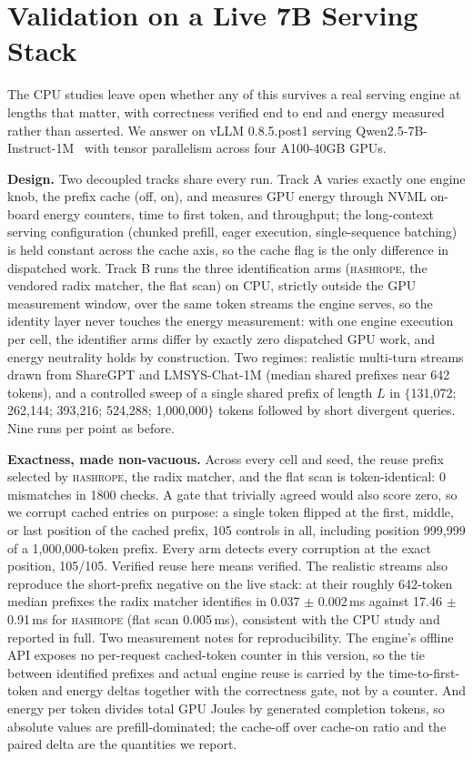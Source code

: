 \documentclass[10pt,conference]{IEEEtran}
\newcommand{\hr}{\textsc{hashrope}}
\newcommand{\ms}{\,ms}
\begin{document}
\section{Validation on a Live 7B Serving Stack}\label{sec:realstack}

The CPU studies leave open whether any of this survives a real serving
engine at lengths that matter, with correctness verified end to end and
energy measured rather than asserted. We answer on vLLM 0.8.5.post1
serving Qwen2.5-7B-Instruct-1M~\cite{yang2025qwen1m} with tensor
parallelism across four A100-40GB GPUs.

\textbf{Design.} Two decoupled tracks share every run. Track A varies
exactly one engine knob, the prefix cache (off, on), and measures GPU
energy through NVML on-board energy counters, time to first token, and
throughput; the long-context serving configuration (chunked prefill,
eager execution, single-sequence batching) is held constant across the
cache axis, so the cache flag is the only difference in dispatched
work. Track B runs the three identification arms (\hr{}, the
vendored radix matcher, the flat scan) on CPU, strictly outside the GPU
measurement window, over the same token streams the engine serves, so
the identity layer never touches the energy measurement: with one
engine execution per cell, the identifier arms differ by exactly zero
dispatched GPU work, and energy neutrality holds by construction. Two
regimes: realistic multi-turn
streams drawn from ShareGPT and LMSYS-Chat-1M (median shared prefixes
near 642 tokens), and a controlled sweep of a single shared prefix of
length $L$ in $\{$131{,}072; 262{,}144; 393{,}216; 524{,}288;
1{,}000{,}000$\}$ tokens followed by short divergent queries. Nine runs
per point as before.

\textbf{Exactness, made non-vacuous.} Across every cell and seed, the
reuse prefix selected by \hr{}, the radix matcher, and the flat scan is
token-identical: 0 mismatches in 1800 checks. A gate that trivially
agreed would also score zero, so we corrupt cached entries on purpose:
a single token flipped at the first, middle, or last position of the
cached prefix, 105 controls in all, including position 999{,}999 of a
1{,}000{,}000-token prefix. Every arm detects every corruption at the
exact position, 105/105. Verified reuse here means verified. The
realistic streams also reproduce the short-prefix negative on the live
stack: at their roughly 642-token median prefixes the radix matcher
identifies in 0.037 $\pm$ 0.002\ms{} against 17.46 $\pm$ 0.91\ms{} for
\hr{} (flat scan 0.005\ms{}), consistent with the CPU study and
reported in full. Two measurement notes for reproducibility. The
engine's offline API exposes no per-request cached-token counter in
this version, so the tie between identified prefixes and actual engine
reuse is carried by the time-to-first-token and energy deltas together
with the correctness gate, not by a counter. And energy per token
divides total GPU Joules by generated completion tokens, so absolute
values are prefill-dominated; the cache-off over cache-on ratio and
the paired delta are the quantities we report.
\end{document}
